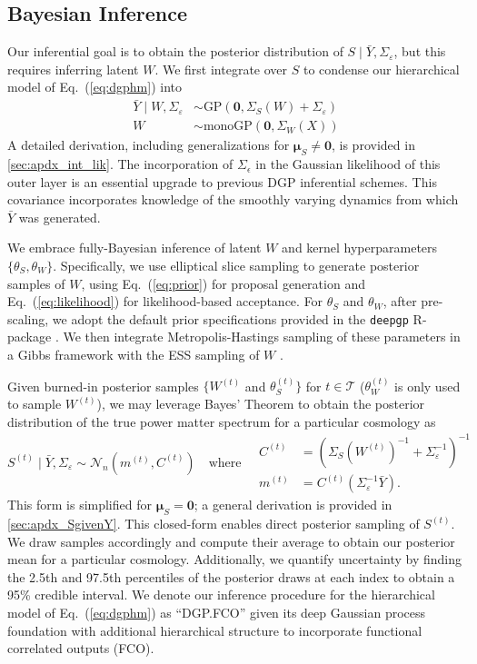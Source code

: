 \documentclass[11pt]{article}
\begin{document}
\subsection{Bayesian Inference}

Our inferential goal is to obtain the posterior distribution of 
$S\mid\bar{Y},\Sigma_\varepsilon$, but this requires inferring latent $W$.  
We first integrate over $S$ to condense our hierarchical model of Eq.~(\ref{eq:dgphm}) into
\begin{align}
\label{eq:likelihood}
\bar{Y} \mid W, \Sigma_\varepsilon &\sim \textrm{GP}(\mathbf{0}, \Sigma_S(W) + \Sigma_\varepsilon) \\
\label{eq:prior}
W &\sim \mathrm{monoGP}\left(\mathbf{0}, \Sigma_W(X)\right)
\end{align}
A detailed derivation, including generalizations for 
$\boldsymbol{\mu}_S\neq\mathbf{0}$, is provided in \ref{sec:apdx_int_lik}. 
The incorporation of $\Sigma_\epsilon$ in the
Gaussian likelihood of this outer layer is an essential upgrade to previous DGP inferential schemes.
This covariance incorporates knowledge of the smoothly varying dynamics from which $\bar{Y}$ was
generated.

We embrace fully-Bayesian inference of latent $W$ and kernel hyperparameters $\{\theta_S, \theta_W\}$.
Specifically, we use elliptical slice sampling \citep[ESS;][]{murray2010elliptical} to 
generate posterior samples of $W$, using Eq.~(\ref{eq:prior}) for proposal generation and 
Eq.~(\ref{eq:likelihood}) for likelihood-based acceptance.  
For $\theta_S$ and $\theta_W$, after pre-scaling, we adopt the default prior specifications 
provided in the {\tt deepgp} {\sf R}-package \citep{deepgp}.
We then integrate Metropolis-Hastings sampling of these parameters in a Gibbs framework 
with the ESS sampling of $W$ \citep{sauer2023active}.

Given burned-in posterior samples $\{W^{(t)}$ and $\theta_S^{(t)}\}$
for $t\in\mathcal{T}$ ($\theta_W^{(t)}$ is only used to sample $W^{(t)}$), 
we may leverage Bayes' Theorem to obtain the
posterior distribution of the true power matter spectrum for a particular cosmology as
\[
S^{(t)}\mid\bar{Y}, \Sigma_\varepsilon \sim \mathcal{N}_n(m^{(t)}, C^{(t)})
\quad\textrm{where}\quad
\begin{array}{rl}
C^{(t)}&=\left(\Sigma_S(W^{(t)})^{-1}+\Sigma_\varepsilon^{-1}\right)^{-1} \\
m^{(t)}&=C^{(t)}\left(\Sigma_\varepsilon^{-1}\bar{Y}\right).
\end{array}
\] 
This form is simplified for $\boldsymbol{\mu}_S=\mathbf{0}$; a general derivation 
is provided in \ref{sec:apdx_SgivenY}.  This closed-form enables direct posterior
sampling of $S^{(t)}$.  We draw samples accordingly and compute their average 
to obtain our posterior mean for a particular cosmology. 
Additionally, we quantify uncertainty by finding the 2.5th and 97.5th percentiles 
of the posterior draws at each index to obtain a 95\% credible interval.
We denote our inference procedure for the hierarchical model of Eq.~(\ref{eq:dgphm}) as
``DGP.FCO'' given its deep Gaussian process foundation with additional hierarchical
structure to incorporate functional correlated outputs (FCO).
\end{document}
